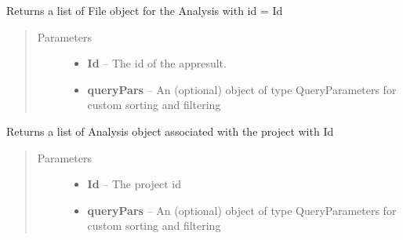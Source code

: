 \documentclass[letterpaper,10pt,english]{sphinxmanual}
\begin{document}
\begin{fulllineitems}
\begin{fulllineitems}
\begin{quote}
\begin{description}
\end{description}\end{quote}

\end{fulllineitems}


\begin{fulllineitems}
\label{Available modules:BaseSpacePy.api.BaseSpaceAPI.BaseSpaceAPI.getAppResultFiles}
Returns a list of File object for the Analysis with id  = Id
\begin{quote}\begin{description}
\item[{Parameters}] \leavevmode\begin{itemize}
\item {} 
\textbf{Id} -- The id of the appresult.

\item {} 
\textbf{queryPars} -- An (optional) object of type QueryParameters for custom sorting and filtering

\end{itemize}

\end{description}\end{quote}

\end{fulllineitems}


\begin{fulllineitems}
\label{Available modules:BaseSpacePy.api.BaseSpaceAPI.BaseSpaceAPI.getAppResultsByProject}
Returns a list of Analysis object associated with the project with Id
\begin{quote}\begin{description}
\item[{Parameters}] \leavevmode\begin{itemize}
\item {} 
\textbf{Id} -- The project id

\item {} 
\textbf{queryPars} -- An (optional) object of type QueryParameters for custom sorting and filtering


\end{itemize}
\end{description}
\end{quote}
\end{fulllineitems}
\end{fulllineitems}
\end{document}
